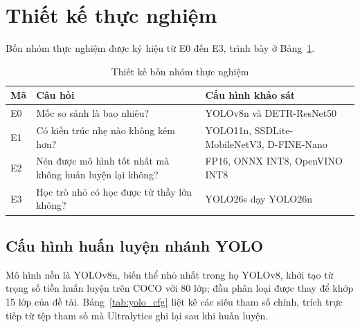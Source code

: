 \section{Thiết kế thực nghiệm}

Bốn nhóm thực nghiệm được ký hiệu từ E0 đến E3, trình bày ở Bảng~\ref{tab:thietke}.

\begin{table}[H]
\centering
\caption{Thiết kế bốn nhóm thực nghiệm}
\label{tab:thietke}
\small
\begin{tabular}{p{1.1cm} p{5.0cm} p{7.4cm}}
\toprule
\textbf{Mã} & \textbf{Câu hỏi} & \textbf{Cấu hình khảo sát} \\
\midrule
E0 & Mốc so sánh là bao nhiêu? & YOLOv8n và DETR-ResNet50 \\
E1 & Có kiến trúc nhẹ nào không kém hơn? & YOLO11n, SSDLite-MobileNetV3, D-FINE-Nano \\
E2 & Nén được mô hình tốt nhất mà không huấn luyện lại không? & FP16, ONNX INT8, OpenVINO INT8 \\
E3 & Học trò nhỏ có học được từ thầy lớn không? & YOLO26s dạy YOLO26n \\
\bottomrule
\end{tabular}
\end{table}

\subsection{Cấu hình huấn luyện nhánh YOLO}

Mô hình nền là YOLOv8n, biến thể nhỏ nhất trong họ YOLOv8, khởi tạo từ trọng số tiền huấn luyện
trên COCO với 80 lớp; đầu phân loại được thay để khớp 15 lớp của đề tài. Bảng~\ref{tab:yolo_cfg}
liệt kê các siêu tham số chính, trích trực tiếp từ tệp tham số mà Ultralytics ghi lại sau khi
huấn luyện.

